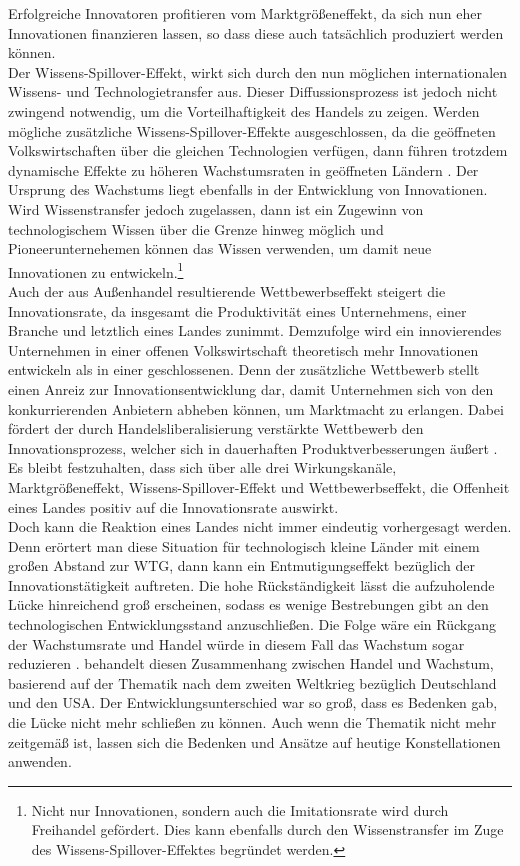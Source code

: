 %
 Erfolgreiche Innovatoren profitieren vom Marktgrößeneffekt, da sich nun eher Innovationen finanzieren lassen, so dass diese auch tatsächlich produziert werden können. \\
%
Der Wissens-Spillover-Effekt, wirkt sich durch den nun möglichen internationalen Wissens- und Technologietransfer aus. Dieser Diffussionsprozess ist jedoch nicht zwingend notwendig, um die Vorteilhaftigkeit des Handels zu zeigen. Werden mögliche zusätzliche Wissens-Spillover-Effekte ausgeschlossen, da die geöffneten Volkswirtschaften über die gleichen Technologien verfügen, dann führen trotzdem dynamische Effekte zu höheren Wachstumsraten in geöffneten Ländern \cite{Grossman.1991b}. Der Ursprung des Wachstums liegt ebenfalls in der Entwicklung von Innovationen.\\
%
 Wird Wissenstransfer jedoch zugelassen, dann ist ein Zugewinn von technologischem Wissen über die Grenze hinweg möglich und  Pioneerunternehemen können das Wissen verwenden, um damit neue Innovationen zu entwickeln.\footnote{Nicht nur Innovationen, sondern auch die Imitationsrate wird durch Freihandel gefördert. Dies kann ebenfalls durch den Wissenstransfer im Zuge des Wissens-Spillover-Effektes begründet werden.} \\
%
Auch der aus Außenhandel resultierende Wettbewerbseffekt steigert die Innovationsrate, da insgesamt die Produktivität eines Unternehmens, einer Branche und letztlich eines Landes zunimmt. Demzufolge wird ein innovierendes Unternehmen in einer offenen Volkswirtschaft theoretisch mehr Innovationen entwickeln als in einer geschlossenen.
Denn der zusätzliche Wettbewerb stellt einen Anreiz zur Innovationsentwicklung dar, damit Unternehmen sich von den konkurrierenden Anbietern abheben können, um Marktmacht zu erlangen. Dabei fördert der durch Handelsliberalisierung verstärkte Wettbewerb den Innovationsprozess, welcher sich in dauerhaften Produktverbesserungen äußert \cite{Segerstrom.1990}.\\
%
Es bleibt festzuhalten, dass sich über alle drei Wirkungskanäle, Marktgrößeneffekt, Wissens-Spillover-Effekt und Wettbewerbseffekt, die Offenheit eines Landes positiv auf die Innovationsrate auswirkt.\\
%
Doch kann die Reaktion eines Landes nicht immer eindeutig vorhergesagt werden. Denn erörtert man diese Situation für technologisch kleine Länder mit einem großen Abstand zur WTG, dann kann ein Entmutigungseffekt bezüglich der Innovationstätigkeit auftreten. Die hohe Rückständigkeit lässt die aufzuholende Lücke hinreichend groß erscheinen, sodass es wenige Bestrebungen gibt an den technologischen Entwicklungsstand anzuschließen. Die Folge wäre ein Rückgang der Wachstumsrate und Handel würde in diesem Fall das Wachstum sogar reduzieren \cite{Aghion.2015}. \cite{Hicks.1968} behandelt diesen Zusammenhang zwischen Handel und Wachstum, basierend auf der Thematik nach dem zweiten Weltkrieg bezüglich Deutschland und den USA. Der Entwicklungsunterschied war so groß, dass es Bedenken gab, die Lücke nicht mehr schließen zu können. Auch wenn die Thematik nicht mehr zeitgemäß ist, lassen sich die Bedenken und Ansätze auf heutige Konstellationen anwenden.\\
